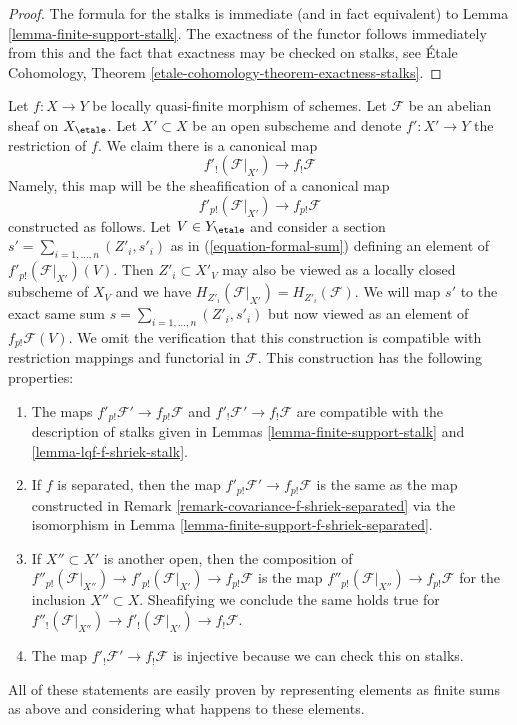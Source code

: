 \begin{proof}
The formula for the stalks is immediate (and in fact equivalent) to
Lemma \ref{lemma-finite-support-stalk}.
The exactness of the functor follows immediately from this
and the fact that exactness may be checked on stalks, see
\'Etale Cohomology, Theorem \ref{etale-cohomology-theorem-exactness-stalks}.
\end{proof}

\begin{remark}
\label{remark-covariance-lqf-f-shriek}
Let $f : X \to Y$ be locally quasi-finite morphism of schemes. Let
$\mathcal{F}$ be an abelian sheaf on $X_\etale$.
Let $X' \subset X$ be an open subscheme and denote $f' : X' \to Y$
the restriction of $f$.
We claim there is a canonical map
$$
f'_!(\mathcal{F}|_{X'}) \longrightarrow f_!\mathcal{F}
$$
Namely, this map will be the sheafification of a canonical map
$$
f'_{p!}(\mathcal{F}|_{X'}) \to f_{p!}\mathcal{F}
$$
constructed as follows. Let $V \in Y_\etale$ and consider a section
$s' = \sum_{i = 1, \ldots, n} (Z'_i, s'_i)$ as in
(\ref{equation-formal-sum}) defining an element of
$f'_{p!}(\mathcal{F}|_{X'})(V)$.
Then $Z'_i \subset X'_V$ may also be viewed as a locally closed subscheme
of $X_V$ and we have $H_{Z'_i}(\mathcal{F}|_{X'}) = H_{Z'_i}(\mathcal{F})$.
We will map $s'$ to the exact same sum
$s = \sum_{i = 1, \ldots, n} (Z'_i, s'_i)$
but now viewed as an element of $f_{p!}\mathcal{F}(V)$.
We omit the verification that this construction is compatible with
restriction mappings and functorial in $\mathcal{F}$.
This construction has the following properties:
\begin{enumerate}
\item The maps $f'_{p!}\mathcal{F}' \to f_{p!}\mathcal{F}$ and
$f'_!\mathcal{F}' \to f_!\mathcal{F}$ are compatible with
the description of stalks given in Lemmas
\ref{lemma-finite-support-stalk} and \ref{lemma-lqf-f-shriek-stalk}.
\item If $f$ is separated, then the map
$f'_{p!}\mathcal{F}' \to f_{p!}\mathcal{F}$ is the same as the map
constructed in Remark \ref{remark-covariance-f-shriek-separated}
via the isomorphism in Lemma \ref{lemma-finite-support-f-shriek-separated}.
\item If $X'' \subset X'$ is another open, then the composition of
$f''_{p!}(\mathcal{F}|_{X''}) \to f'_{p!}(\mathcal{F}|_{X'}) \to
f_{p!}\mathcal{F}$ is the map
$f''_{p!}(\mathcal{F}|_{X''}) \to f_{p!}\mathcal{F}$ for the
inclusion $X'' \subset X$. Sheafifying we conclude
the same holds true for
$f''_!(\mathcal{F}|_{X''}) \to f'_!(\mathcal{F}|_{X'}) \to f_!\mathcal{F}$.
\item The map $f'_!\mathcal{F}' \to f_!\mathcal{F}$ is injective
because we can check this on stalks.
\end{enumerate}
All of these statements are easily proven by representing elements
as finite sums as above and considering what happens to these elements.
\end{remark}

